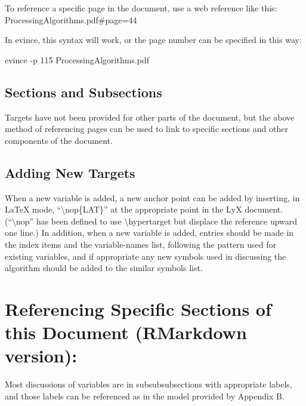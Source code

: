 \documentclass[
]{book}
\begin{document}
To reference a specific page in the document, use a web reference like this:
ProcessingAlgorithms.pdf\#page=44

In evince, this syntax will work, or the page number can be specified in this way:

evince -p 115 ProcessingAlgorithms.pdf

\hypertarget{sections-and-subsections}{%
\subsection*{Sections and Subsections}\label{sections-and-subsections}}

Targets have not been provided for other parts of the document, but the above method of referencing pages can be used to link to specific sections and other components of the document.

\hypertarget{adding-new-targets}{%
\subsection*{Adding New Targets}\label{adding-new-targets}}

When a new variable is added, a new anchor point can be added by inserting, in LaTeX mode, ``\textbackslash nop\{LAT\}'' at the appropriate point in the LyX document. (``\textbackslash nop'' has been defined to use \textbackslash hypertarget but displace the reference upward one line.) In addition, when a new variable is added, entries should be made in the index items and the variable-names list, following the pattern used for existing variables, and if appropriate any new symbols used in discussing the algorithm should be added to the similar symbols list.

\hypertarget{referencing-specific-sections-of-this-document-rmarkdown-version}{%
\section*{Referencing Specific Sections of this Document (RMarkdown version):}\label{referencing-specific-sections-of-this-document-rmarkdown-version}}

Most discussions of variables are in subsubsubsections with appropriate labels, and those labels can be referenced as in the model provided by Appendix B.
\end{document}

